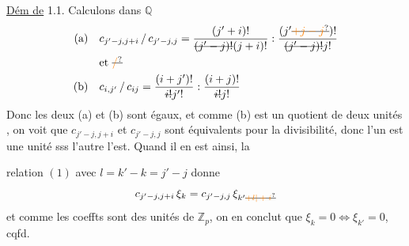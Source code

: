 \uline{Dém de} 1.1. Calculons dans $\mathbb Q$
\[
\begin{aligned}
\text{(a)}\quad &c_{j'-j,j+i}\,/\,c_{j'-j,j}=\frac{(j'+i)!}{\deleted{(j'-j)!}(j+i)!}:\frac{(j'\deleted{\unsure{+j-j}})!}{\deleted{(j'-j)!}j!}\\
&\text{et }\deleted{\unsure{/}}\\
\text{(b)}\quad &c_{i,j'}\,/\,c_{ij}=\frac{(i+j')!}{\deleted{i!}j'!}:\frac{(i+j)!}{\deleted{i!}j!}
\end{aligned}
\]
\deleted{\[
\text{(b)}\quad c_{i,j'}/c_{ij}=\frac{(i+j')!}{i!\,j'!}:\frac{(i+j)!}{i!\,\unsure{j!}}
\]}
Donc les deux  (a) et (b) sont égaux, et comme (b) est un quotient de deux unités  , on voit que $c_{j'-j,j+i}$ et $c_{j'-j,j}$ sont équivalents pour la divisibilité, donc l'un est une unité sss l'autre l'est. Quand il en est ainsi, la

relation $(1)$ avec $l=k'-k=j'-j$ donne
\[
c_{j'-j,j+i}\,\xi_k=c_{j'-j,j}\,\xi_{k'\deleted{\unsure{+l|+i}}}
\]
et comme les coeffts sont des unités de $\mathbb Z_p$, on en conclut que $\xi_k=0\Longleftrightarrow\xi_{k'}=0$, cqfd.

